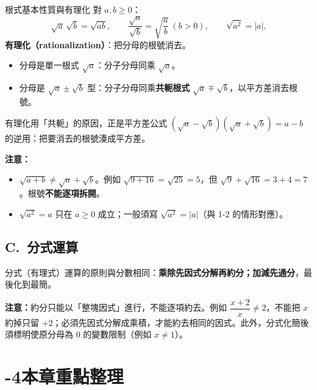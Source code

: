 \documentclass[11pt]{article}
\begin{document}
\begin{補充框}{根式基本性質與有理化}
對 $a,b\ge0$：
$$\sqrt a\,\sqrt b=\sqrt{ab},\qquad\frac{\sqrt a}{\sqrt b}=\sqrt{\frac ab}\ (b>0),\qquad \sqrt{a^2}=|a|.$$
\textbf{有理化（rationalization）}：把分母的根號消去。
\begin{itemize}\setlength{\itemsep}{1pt}
\item 分母是單一根式 $\sqrt a$：分子分母同乘 $\sqrt a$。
\item 分母是 $\sqrt a\pm\sqrt b$ 型：分子分母同乘\textbf{共軛根式} $\sqrt a\mp\sqrt b$，以平方差消去根號。
\end{itemize}
有理化用「共軛」的原因，正是平方差公式 $(\sqrt a-\sqrt b)(\sqrt a+\sqrt b)=a-b$ 的逆用：把要消去的根號湊成平方差。
\end{補充框}

\textbf{注意：}
\begin{itemize}\setlength{\itemsep}{1pt}
\item $\sqrt{a+b}\ne\sqrt a+\sqrt b$。例如 $\sqrt{9+16}=\sqrt{25}=5$，但 $\sqrt9+\sqrt{16}=3+4=7$。根號\textbf{不能逐項拆開}。
\item $\sqrt{a^2}=a$ 只在 $a\ge0$ 成立；一般須寫 $\sqrt{a^2}=|a|$（與 1-2 的情形對應）。
\end{itemize}

\subsection*{\sffamily C.\ 分式運算}

分式（有理式）運算的原則與分數相同：\textbf{乘除先因式分解再約分；加減先通分}，最後化到最簡。

\textbf{注意：}約分只能以「整塊因式」進行，不能逐項約去。例如 $\dfrac{x+2}{x}\ne 2$，不能把 $x$ 約掉只留 $+2$；必須先因式分解成乘積，才能約去相同的因式。此外，分式化簡後須標明使原分母為 $0$ 的變數限制（例如 $x\ne 1$）。

\section*{-4\quad 本章重點整理}
\end{document}
